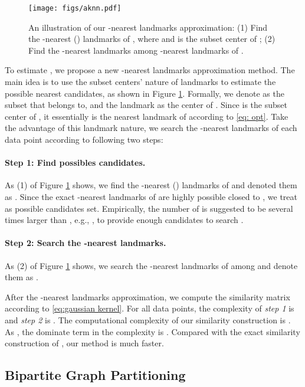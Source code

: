\documentclass[a4paper,fleqn]{cas-dc}
\begin{document}
\begin{figure}
    \centering
    \texttt{[image: figs/aknn.pdf]}
    \caption{An illustration of our -nearest landmarks approximation: 
    (1) Find the -nearest () landmarks of , where  and  is the subset center of ;
    (2) Find the -nearest landmarks among -nearest landmarks of .
    }
    \label{fig:illustion_aknn}
\end{figure}

To estimate , we propose a new -nearest landmarks approximation method.
The main idea is to use the subset centers' nature of landmarks to estimate the possible nearest candidates, as shown in Figure \ref{fig:illustion_aknn}.
Formally, we denote  as the subset that  belongs to, and the landmark  as the center of .
Since  is the subset center of , it essentially is the nearest landmark of  according to \eqref{eq: opt}.
Take the advantage of this landmark nature, we search the -nearest landmarks of each data point  according to following two steps:
\paragraph{Step 1: Find  possibles candidates.}
As (1) of Figure \ref{fig:illustion_aknn} shows, we find the -nearest () landmarks of  and denoted them as .
Since the exact -nearest landmarks of  are highly possible closed to , we treat  as possible candidates set.
Empirically, the number of  is suggested to be several times larger than , e.g., , to provide enough candidates to search .
\paragraph{Step 2: Search the -nearest landmarks.}
As (2) of Figure \ref{fig:illustion_aknn} shows,
we search the -nearest landmarks of  among  and denote them as .

After the -nearest landmarks approximation, we compute the similarity matrix  according to \eqref{eq:gaussian kernel}.
For all data points, the complexity of \textit{step 1} is  and \textit{step 2} is .
The computational complexity of our similarity construction is .
As , the dominate term in the complexity is .
Compared with the exact similarity construction of  \cite{cai2014large,ye2018large}, our method is much faster.

\subsection{Bipartite Graph Partitioning}
\label{sec:bipartite_partition}
\end{document}
